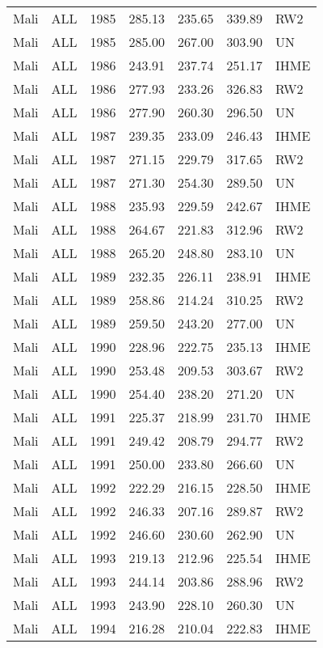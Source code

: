\begin{longtable}{lllrrrl}
  Mali & ALL & 1985 & 285.13 & 235.65 & 339.89 & RW2 \\ 
  Mali & ALL & 1985 & 285.00 & 267.00 & 303.90 & UN \\ 
  Mali & ALL & 1986 & 243.91 & 237.74 & 251.17 & IHME \\ 
  Mali & ALL & 1986 & 277.93 & 233.26 & 326.83 & RW2 \\ 
  Mali & ALL & 1986 & 277.90 & 260.30 & 296.50 & UN \\ 
  Mali & ALL & 1987 & 239.35 & 233.09 & 246.43 & IHME \\ 
  Mali & ALL & 1987 & 271.15 & 229.79 & 317.65 & RW2 \\ 
  Mali & ALL & 1987 & 271.30 & 254.30 & 289.50 & UN \\ 
  Mali & ALL & 1988 & 235.93 & 229.59 & 242.67 & IHME \\ 
  Mali & ALL & 1988 & 264.67 & 221.83 & 312.96 & RW2 \\ 
  Mali & ALL & 1988 & 265.20 & 248.80 & 283.10 & UN \\ 
  Mali & ALL & 1989 & 232.35 & 226.11 & 238.91 & IHME \\ 
  Mali & ALL & 1989 & 258.86 & 214.24 & 310.25 & RW2 \\ 
  Mali & ALL & 1989 & 259.50 & 243.20 & 277.00 & UN \\ 
  Mali & ALL & 1990 & 228.96 & 222.75 & 235.13 & IHME \\ 
  Mali & ALL & 1990 & 253.48 & 209.53 & 303.67 & RW2 \\ 
  Mali & ALL & 1990 & 254.40 & 238.20 & 271.20 & UN \\ 
  Mali & ALL & 1991 & 225.37 & 218.99 & 231.70 & IHME \\ 
  Mali & ALL & 1991 & 249.42 & 208.79 & 294.77 & RW2 \\ 
  Mali & ALL & 1991 & 250.00 & 233.80 & 266.60 & UN \\ 
  Mali & ALL & 1992 & 222.29 & 216.15 & 228.50 & IHME \\ 
  Mali & ALL & 1992 & 246.33 & 207.16 & 289.87 & RW2 \\ 
  Mali & ALL & 1992 & 246.60 & 230.60 & 262.90 & UN \\ 
  Mali & ALL & 1993 & 219.13 & 212.96 & 225.54 & IHME \\ 
  Mali & ALL & 1993 & 244.14 & 203.86 & 288.96 & RW2 \\ 
  Mali & ALL & 1993 & 243.90 & 228.10 & 260.30 & UN \\ 
  Mali & ALL & 1994 & 216.28 & 210.04 & 222.83 & IHME \\ 

\end{longtable}
